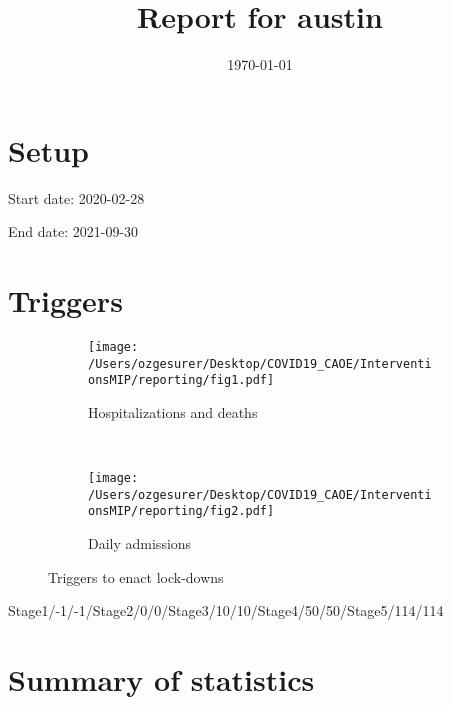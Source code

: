 \documentclass{article}
\title{Report for austin}
\author{}
\date{\today}
\begin{document}
\maketitle

\section*{Setup}

Start date: 2020-02-28

End date: 2021-09-30 




\section*{Triggers}
\begin{figure}[!htb]
  \centering
  \setlength{\unitlength}{1cm}
    \begin{subfigure}[b]{0.475\linewidth}
    \centering
        \texttt{[image: /Users/ozgesurer/Desktop/COVID19\_CAOE/InterventionsMIP/reporting/fig1.pdf]}
        \caption{Hospitalizations  and deaths}
        \label{fig:IHD}
    \end{subfigure}
    ~
    \begin{subfigure}[b]{0.475\linewidth}
    \centering
         \texttt{[image: /Users/ozgesurer/Desktop/COVID19\_CAOE/InterventionsMIP/reporting/fig2.pdf]}
        \caption{Daily admissions}
        \label{fig:IYIH}
    \end{subfigure}
    \caption{Triggers to enact lock-downs}\label{fig:SD90}
\end{figure}

Stage1/-1/-1/Stage2/0/0/Stage3/10/10/Stage4/50/50/Stage5/114/114

\newpage

\section*{Summary of statistics}
\end{document}
